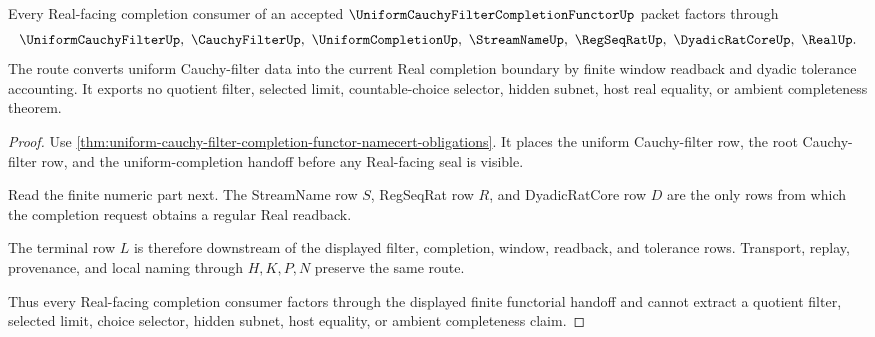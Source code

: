 \begin{theorem}
\label{thm:uniform-cauchy-filter-completion-functor-real-route}
Every Real-facing completion consumer of an accepted $\UniformCauchyFilterCompletionFunctorUp$ packet factors through
$$
\UniformCauchyFilterUp,\ \CauchyFilterUp,\ \UniformCompletionUp,\ \StreamNameUp,\ \RegSeqRatUp,\ \DyadicRatCoreUp,\ \RealUp .
$$
The route converts uniform Cauchy-filter data into the current Real completion boundary by finite window readback and dyadic tolerance accounting. It exports no quotient filter, selected limit, countable-choice selector, hidden subnet, host real equality, or ambient completeness theorem.
\end{theorem}
\begin{proof}
Use \autoref{thm:uniform-cauchy-filter-completion-functor-namecert-obligations}. It places the uniform Cauchy-filter row, the root Cauchy-filter row, and the uniform-completion handoff before any Real-facing seal is visible.

Read the finite numeric part next. The StreamName row $S$, RegSeqRat row $R$, and DyadicRatCore row $D$ are the only rows from which the completion request obtains a regular Real readback.

The terminal row $L$ is therefore downstream of the displayed filter, completion, window, readback, and tolerance rows. Transport, replay, provenance, and local naming through $H,K,P,N$ preserve the same route.

Thus every Real-facing completion consumer factors through the displayed finite functorial handoff and cannot extract a quotient filter, selected limit, choice selector, hidden subnet, host equality, or ambient completeness claim.
\end{proof}




